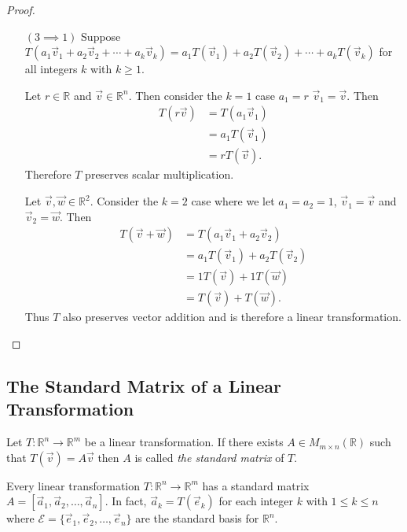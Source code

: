 \begin{proof}
\begin{enumerate}
\item[$(3 \implies 1)$] Suppose 
$T(a_1\vec{v}_1+a_2\vec{v}_2+\cdots+a_k\vec{v}_k)=
a_1T(\vec{v}_1)+a_2T(\vec{v}_2)+\cdots+a_kT(\vec{v}_k)$ for all integers $k$ with $k \ge 1$.

Let $r\in \mathbb{R}$ and $\vec{v} \in \mathbb{R}^n$.
Then consider the $k=1$ case $a_1=r$ $\vec{v}_1=\vec{v}$. Then 
\begin{align*}
T(r\vec{v})&=T(a_1\vec{v}_1)\\
&=a_1T(\vec{v}_1)\\
&=rT(\vec{v}).
\end{align*}
Therefore $T$ preserves scalar multiplication.

Let $\vec{v},\vec{w} \in \mathbb{R}^2$. Consider the $k=2$ case where we let 
$a_1=a_2=1$, $\vec{v}_1=\vec{v}$ and $\vec{v}_2=\vec{w}$. Then
\begin{align*}
T(\vec{v}+\vec{w})&=T(a_1\vec{v}_1+a_2\vec{v}_2)\\
&=a_1T(\vec{v}_1)+a_2T(\vec{v}_2)\\
&=1T(\vec{v})+1T(\vec{w})\\
&=T(\vec{v})+T(\vec{w}).
\end{align*}
Thus $T$ also preserves vector addition and is therefore a 
linear transformation.
\end{enumerate}
\end{proof}



\subsection{The Standard Matrix of a Linear Transformation}


\begin{definition}
Let  $T:\mathbb{R}^n \to \mathbb{R}^m$ be a linear transformation. If there 
exists $A \in M_{m\times n}(\mathbb{R})$ such that $T(\vec{v})=A\vec{v}$ then 
$A$ is called \emph{the standard matrix} of $T$.
\end{definition}

\begin{theorem} Every linear transformation $T:\mathbb{R}^n \to \mathbb{R}^m$ 
has a standard matrix $A=[\vec{a}_1,\vec{a}_2, \ldots, \vec{a}_n]$. In fact,
$\vec{a}_k=T(\vec{e}_k)$ for each integer $k$ with $1 \le k \le n$ 
where $\mathcal{E}=\{\vec{e}_1,\vec{e}_2,\ldots,\vec{e}_n\}$ are the 
standard basis for $\mathbb{R}^n$.\label{thm:standard_matrix}
\end{theorem}

